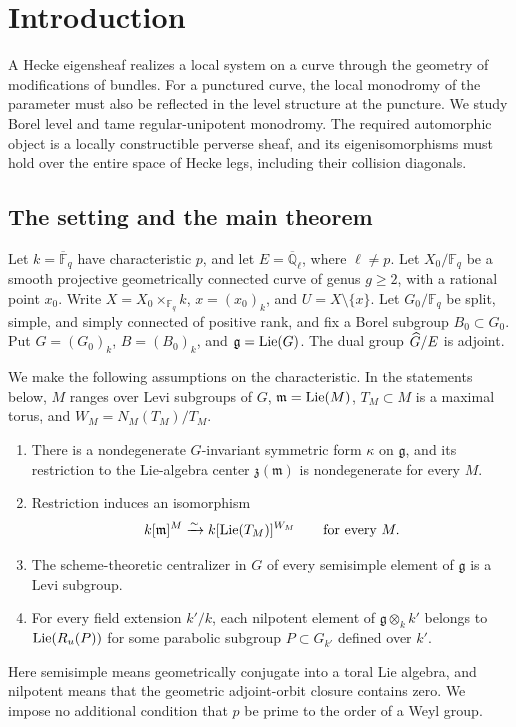 \section{Introduction}\label{sec:introduction}

A Hecke eigensheaf realizes a local system on a curve through the geometry of
modifications of bundles. For a punctured curve, the local monodromy of the
parameter must also be reflected in the level structure at the puncture.
We study Borel level and tame regular-unipotent monodromy. The required
automorphic object is a locally constructible perverse sheaf, and its
eigenisomorphisms must hold over the entire space of Hecke legs, including
their collision diagonals.

\subsection{The setting and the main theorem}
Let $k=\overline{\mathbb F}_q$ have characteristic $p$, and let
$E=\overline{\mathbb Q}_\ell$, where $\ell\ne p$.
Let $X_0/\mathbb F_q$ be a smooth projective geometrically connected curve of
genus $g\ge2$, with a rational point $x_0$.
Write $X=X_0\times_{\mathbb F_q}k$, $x=(x_0)_k$, and $U=X\setminus\{x\}$.
Let $G_0/\mathbb F_q$ be split, simple, and simply connected of positive rank,
and fix a Borel subgroup $B_0\subset G_0$.
Put $G=(G_0)_k$, $B=(B_0)_k$, and $\mathfrak g=\operatorname{Lie}(G)$.
The dual group $\widehat G/E$ is adjoint.

We make the following assumptions on the characteristic. In the statements
below, $M$ ranges over Levi subgroups of $G$, $\mathfrak m=\operatorname{Lie}(M)$,
$T_M\subset M$ is a maximal torus, and $W_M=N_M(T_M)/T_M$.
\begin{enumerate}[label=\textup{(H\arabic*)},ref=H\arabic*]
\item\label{hyp:form}
There is a nondegenerate $G$-invariant symmetric form $\kappa$ on
$\mathfrak g$, and its restriction to the Lie-algebra center
$\mathfrak z(\mathfrak m)$ is nondegenerate for every $M$.
\item\label{hyp:chevalley}
Restriction induces an isomorphism
\[
 k[\mathfrak m]^M\xrightarrow{\sim}k[\operatorname{Lie}(T_M)]^{W_M}
 \qquad\text{for every }M.
\]
\item\label{hyp:centralizer}
The scheme-theoretic centralizer in $G$ of every semisimple element of
$\mathfrak g$ is a Levi subgroup.
\item\label{hyp:nilpotent}
For every field extension $k'/k$, each nilpotent element of
$\mathfrak g\otimes_k k'$ belongs to $\operatorname{Lie}(R_u(P))$ for some parabolic
subgroup $P\subset G_{k'}$ defined over $k'$.
\end{enumerate}
Here semisimple means geometrically conjugate into a toral Lie algebra, and
nilpotent means that the geometric adjoint-orbit closure contains zero.
We impose no additional condition that $p$ be prime to the order of a Weyl
group.


